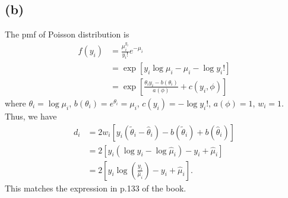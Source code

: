 \subsection*{(b)}
The pmf of Poisson distribution is
\begin{align*}
f(y_{i}) &= \frac{\mu_{i}^{y_{i}}}{y_{i}!}e^{-\mu_{i}}\\
&= \exp\left[y_{i}\log\mu_{i} -\mu_{i} -\log y_{i}!\right]\\
&= \exp\left[\frac{\theta_{i}y_{i} -b(\theta_{i})}{a(\phi)} + c(y_{i},\phi)\right]
\end{align*}
where $\theta_{i} = \log\mu_{i}$, $b(\theta_{i}) = e^{\theta_{i}} = \mu_{i}$, $c(y_{i}) = -\log y_{i}!$, $a(\phi) = 1$, $w_{i} = 1$.\\
Thus, we have
\begin{align*}
d_{i} &= 2w_{i}\left[y_{i}\left(\widetilde{\theta}_{i} - \widehat{\theta}_{i}\right) -b\left(\widetilde{\theta}_{i}\right) + b\left(\widehat{\theta}_{i}\right)\right]\\
&= 2\left[y_{i}\left(\log y_{i} -\log\widehat{\mu}_{i}\right) -y_{i} +\widehat{\mu}_{i}\right]\\
&= 2\left[y_{i}\log\left(\frac{y_{i}}{\widehat{\mu}_{i}}\right) -y_{i} +\widehat{\mu}_{i}\right].
\end{align*}
This matches the expression in p.133 of the book.